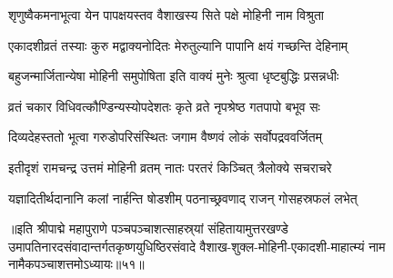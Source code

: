 \twolineshloka
{शृणुष्वैकमनाभूत्वा येन पापक्षयस्तव}
{वैशाखस्य सिते पक्षे मोहिनी नाम विश्रुता}%

\twolineshloka
{एकादशीव्रतं तस्याः कुरु मद्वाक्यनोदितः}
{मेरुतुल्यानि पापानि क्षयं गच्छन्ति देहिनाम्}%

\twolineshloka
{बहुजन्मार्जितान्येषा मोहिनी समुपोषिता}
{इति वाक्यं मुनेः श्रुत्वा धृष्टबुद्धिः प्रसन्नधीः}%

\twolineshloka
{व्रतं चकार विधिवत्कौण्डिन्यस्योपदेशतः}
{कृते व्रते नृपश्रेष्ठ गतपापो बभूव सः}%

\twolineshloka
{दिव्यदेहस्ततो भूत्वा गरुडोपरिसंस्थितः}
{जगाम वैष्णवं लोकं सर्वोपद्रववर्जितम्}%

\twolineshloka
{इतीदृशं रामचन्द्र उत्तमं मोहिनी व्रतम्}
{नातः परतरं किञ्चित् त्रैलोक्ये सचराचरे}%

\twolineshloka
{यज्ञादितीर्थदानानि कलां नार्हन्ति षोडशीम्}
{पठनाच्छ्रवणाद् राजन् गोसहस्रफलं लभेत्}%

॥इति श्रीपाद्मे महापुराणे पञ्चपञ्चाशत्साहस्र्यां संहितायामुत्तरखण्डे उमापतिनारदसंवादान्तर्गतकृष्णयुधिष्ठिरसंवादे वैशाख-शुक्ल-मोहिनी-एकादशी-माहात्म्यं नाम नामैकपञ्चाशत्तमोऽध्यायः॥५१॥

\genMangalaShloka

\hyperref[sec:ekadashi_mahatmyam_padma_puranam]{\closesub}
\clearpage

